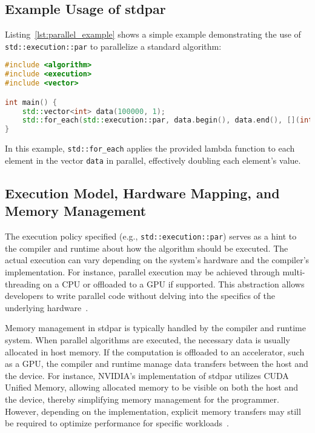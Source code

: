 \subsection{Example Usage of stdpar}

Listing~\ref{lst:parallel_example} shows a simple example demonstrating the use of \texttt{std::execution::par} to parallelize a standard
algorithm:

\begin{lstlisting}[language=C++, caption={Parallel execution using \texttt{std::execution::par}}, label={lst:parallel_example}]
#include <algorithm>
#include <execution>
#include <vector>

int main() {
    std::vector<int> data(100000, 1);
    std::for_each(std::execution::par, data.begin(), data.end(), [](int& x) { x *= 2; });
}
\end{lstlisting}

In this example, \texttt{std::for\_each} applies the provided lambda function to each element in the vector
\texttt{data} in parallel, effectively doubling each element's value.

\subsection{Execution Model, Hardware Mapping, and Memory Management}

The execution policy specified (e.g., \texttt{std::execution::par}) serves as a hint to the compiler and
runtime about how the algorithm should be executed. The actual execution can vary depending on the system's
hardware and the compiler's implementation. For instance, parallel execution may be achieved through
multi-threading on a CPU or offloaded to a GPU if supported. This abstraction allows developers to write
parallel code without delving into the specifics of the underlying hardware~\cite{V'yukova2018}.

Memory management in stdpar is typically handled by the compiler and runtime system. When parallel algorithms
are executed, the necessary data is usually allocated in host memory. If the computation is offloaded to an
accelerator, such as a GPU, the compiler and runtime manage data transfers between the host and the device.
For instance, NVIDIA's implementation of stdpar utilizes CUDA Unified Memory, allowing allocated memory to be
visible on both the host and the device, thereby simplifying memory management for the programmer. However,
depending on the implementation, explicit memory transfers may still be required to optimize performance for
specific workloads~\cite{NVIDIA2020}.

